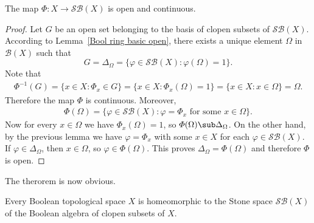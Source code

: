 \begin{lemma}
The map $\varPhi:X\to\mathcal{S}\mathcal{B}(X)$ is open and continuous.
\end{lemma}
\begin{proof}
Let $G$ be an open set belonging to the basis of clopen subsets of $\mathcal{S}\mathcal{B}(X)$. According to Lemma~\ref{Bool ring basic open}, there exists a unique element $\Omega$ in 
$\mathcal{B}(X)$ such that
\[G=\Delta_{\Omega}=\{\varphi\in\mathcal{S}\mathcal{B}(X):\varphi(\Omega)=1\}.\]
Note that
\begin{align*}
\varPhi^{-1}(G)=\{x\in X:\varPhi_x\in G\}=\{x\in X:\varPhi_x(\Omega)=1\}=\{x\in X:x\in\Omega\}=\Omega.
\end{align*}
Therefore the map $\varPhi$ is continuous. Moreover,
\begin{align*}
\varPhi(\Omega)=\{\varphi\in\mathcal{S}\mathcal{B}(X):\varphi=\varPhi_x\text{ for some }x\in\Omega\}.
\end{align*}
Now for every $x\in\Omega$ we have $\varPhi_x(\Omega)=1$, so $\varPhi(\Omega)\sub\Delta_{\Omega}$. On the other hand, by the previous lemma we have $\varphi=\varPhi_x$ with some $x\in X$ for each $\varphi\in\mathcal{S}\mathcal{B}(X)$. If $\varphi\in\Delta_{\Omega}$, then $x\in\Omega$, so 
$\varphi\in\varPhi(\Omega)$. This proves $\Delta_{\Omega}=\varPhi(\Omega)$ and therefore $\varPhi$ is open.
\end{proof}
The therorem is now obvious.
\begin{theorem}
Every Boolean topological space $X$ is homeomorphic to the Stone space $\mathcal{S}\mathcal{B}(X)$ of the Boolean algebra of clopen subsets of $X$.
\end{theorem}
